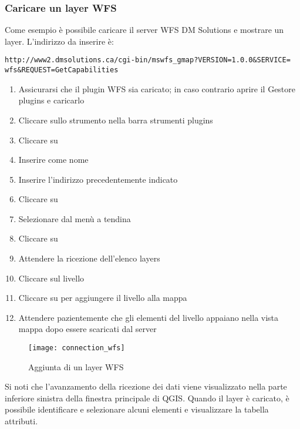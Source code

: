 \subsubsection{Caricare un layer WFS}

Come esempio è possibile caricare il server WFS DM Solutions e mostrare un
layer. L'indirizzo da inserire è:
\begin{verbatim}
http://www2.dmsolutions.ca/cgi-bin/mswfs_gmap?VERSION=1.0.0&SERVICE=
wfs&REQUEST=GetCapabilities
\end{verbatim}

\begin{enumerate}
  \item Assicurarsi che il plugin WFS sia caricato; in caso contrario aprire
  il Gestore plugins e caricarlo
  \item Cliccare sullo strumento  nella barra strumenti plugins
  \item Cliccare su  
  \item Inserire  come nome
  \item Inserire l'indirizzo precedentemente indicato
  \item Cliccare su  
  \item Selezionare  dal menù a
  tendina
  \item Cliccare su  
  \item Attendere la ricezione dell'elenco layers
  \item Cliccare sul livello 
  \item Cliccare su  per aggiungere il livello alla mappa
  \item Attendere pazientemente che gli elementi del livello appaiano nella
  vista mappa dopo essere scaricati dal server
\end{enumerate}

\begin{figure}[ht]
  \begin{center}
  	\caption{Aggiunta di un layer WFS \nixcaption}\label{fig:wfs_dmsolutions}
	\texttt{[image: connection\_wfs]}
  \end{center}
\end{figure}

Si noti che l'avanzamento della ricezione dei dati viene visualizzato nella
parte inferiore sinistra della finestra principale di QGIS. 
Quando il layer è caricato, è possibile identificare e selezionare alcuni
elementi e visualizzare la tabella attributi.

